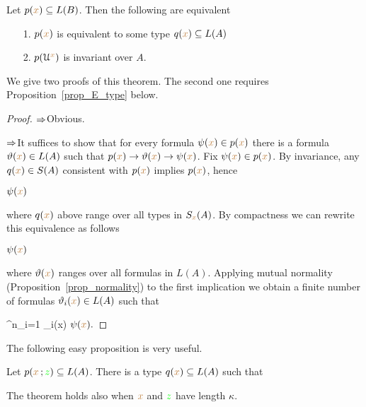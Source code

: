 \begin{proposition}\label{prop_inv_types}
Let $p({\color{brown} x})\subseteq L(B)$.
Then the following are equivalent
\begin{itemize}
 \item[1.] $p({\color{brown} x})$ is equivalent to some type $q({\color{brown} x})\subseteq L(A)$
 \item[2.] $p(\EuScript U^{\color{brown} x})$ is invariant over $A$.
\end{itemize}
\end{proposition}

We give two proofs of this theorem.  The second one requires Proposition~\ref{prop_E_type} below.

\vspace*{-\parskip}
\begin{proof}
$\Rightarrow$\quad Obvious. 

$\Rightarrow$\quad It suffices to show that for every formula $\psi({\color{brown} x})\in p({\color{brown} x})$ there is a formula $\vartheta({\color{brown} x})\in L(A)$ such that $p({\color{brown} x})\rightarrow\vartheta({\color{brown} x})\rightarrow\psi({\color{brown} x})$. Fix $\psi({\color{brown} x})\in p({\color{brown} x})$. By invariance, any $q({\color{brown} x})\in S(A)$ consistent with $p({\color{brown} x})$ implies $p({\color{brown} x})$, hence

\medrel{\imp}$\psi({\color{brown} x})$

where $q({\color{brown} x})$ above range over all types in $S_{\color{brown} x}(A)$. By compactness we can rewrite this equivalence as follows

\medrel{\imp}$\psi({\color{brown} x})$

where $\vartheta({\color{brown} x})$ ranges over all formulas in $L(A)$.
Applying mutual normality (Proposition~\ref{prop_normality}) to the first implication we obtain a finite number of formulas $\vartheta_i({\color{brown} x})\in L(A)$ such that 

{\imp}
{\bigvee^n_{i=1} \theta_i({\mr x})}
\medrel{\imp}
$\psi({\color{brown} x}).$
\end{proof}

The following easy proposition is very useful.

\begin{proposition}\label{prop_E_type}
Let $p({\color{brown} x}\,;{\color{green} z})\subseteq L(A)$.
There is a type $q({\color{brown} x})\subseteq L(A)$ such that


The theorem holds also when ${\color{brown} x}$ and ${\color{green} z}$ have length $\kappa$.
\end{proposition}

